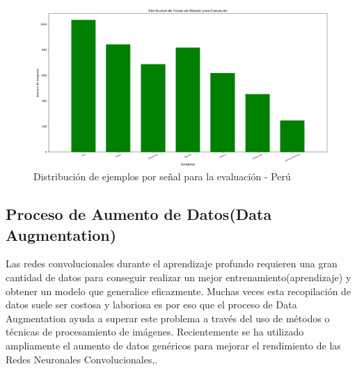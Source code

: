 		\begin{figure}[H]
			\includegraphics[width=1\textwidth]{images/desarrollo/histograms/PeruinitialTest4698}
			\begin{center}
			\caption{\small{Distribución de ejemplos por señal para la evaluación - Perú}}
			{\small{\fontsize{10}{16.8}\selectfont {Fuente: Elaboración propia}}}
			\end{center}
			\vspace{-1.5em}
		\end{figure}

	\subsection{Proceso de Aumento de Datos(Data Augmentation)}

		Las redes convolucionales durante el aprendizaje profundo requieren una gran cantidad de datos para conseguir realizar un mejor entrenamiento(aprendizaje) y obtener un modelo que generalice eficazmente. Muchas veces esta recopilación de datos suele ser costosa y laboriosa es por eso que el proceso de Data Augmentation ayuda a superar este problema a través del uso de métodos o técnicas de procesamiento de imágenes. Recientemente se ha utilizado ampliamente el aumento de datos genéricos para mejorar el rendimiento de las Redes Neuronales Convolucionales,\citep{DL_augmentData}. 


